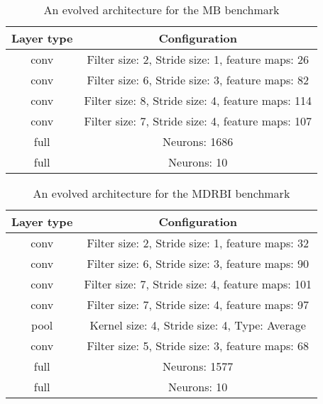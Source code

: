 \documentclass[conference]{IEEEtran}
\begin{document}
\begin{table}[!t]
	\renewcommand{\arraystretch}{1.3}
	\caption{An evolved architecture for the MB benchmark}
	\label{table:EvolvedMBCNN}
	\centering
	\begin{tabular}{|c|c|}
		\hline
		Layer type & Configuration\\
		\hline
		conv & Filter size: 2, Stride size: 1, feature maps: 26\\
		\hline
		conv & Filter size: 6, Stride size: 3, feature maps: 82\\
		\hline
		conv & Filter size: 8, Stride size: 4, feature maps: 114\\
		\hline
		conv & Filter size: 7, Stride size: 4, feature maps: 107\\
		\hline
		full & Neurons: 1686\\
		\hline
		full & Neurons: 10\\
		\hline
	\end{tabular}
\end{table}

\begin{table}[!t]
	\renewcommand{\arraystretch}{1.3}
	\caption{An evolved architecture for the MDRBI benchmark}
	\label{table:EvolvedMDRBICNN}
	\centering
	\begin{tabular}{|c|c|}
		\hline
		Layer type & Configuration\\
		\hline
		conv & Filter size: 2, Stride size: 1, feature maps: 32\\
		\hline
		conv & Filter size: 6, Stride size: 3, feature maps: 90\\
		\hline
		conv & Filter size: 7, Stride size: 4, feature maps: 101\\
		\hline
		conv & Filter size: 7, Stride size: 4, feature maps: 97\\
		\hline
		pool & Kernel size: 4, Stride size: 4, Type: Average\\
		\hline
		conv & Filter size: 5, Stride size: 3, feature maps: 68\\
		\hline
		full & Neurons: 1577\\
		\hline
		full & Neurons: 10\\
		\hline
	\end{tabular}
\end{table}
\end{document}
